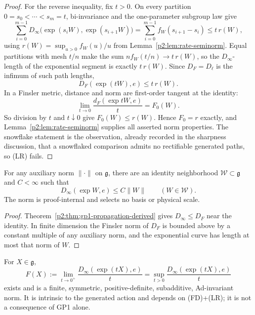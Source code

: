 \documentclass[11pt,a4paper]{article}
\begin{document}
\begin{proof}
For the reverse inequality, fix \(t>0\).  On every partition
\(0=s_0<\cdots<s_m=t\), bi-invariance and the one-parameter subgroup law
give
\[
 \sum_{i=0}^{m-1}
 D_\infty\bigl(\exp(s_iW),\exp(s_{i+1}W)\bigr)
 =
 \sum_{i=0}^{m-1}f_W(s_{i+1}-s_i)
 \le t\,r(W),
\]
using \(r(W)=\sup_{u>0}f_W(u)/u\) from
Lemma~\ref{p2:lem:rate-seminorm}.  Equal partitions with mesh \(t/n\)
make the sum \(n f_W(t/n)\to t\,r(W)\), so the
\(D_\infty\)-length of the exponential segment is exactly \(t\,r(W)\).
Since \(D_F=D_\ell\) is the infimum of such path lengths,
\[
 D_F(\exp(tW),e)\le t\,r(W).
\]
In a Finsler metric, distance and norm are first-order tangent at the
identity:
\[
 \lim_{t\to0}\frac{d_F(\exp tW,e)}{t}=F_0(W).
\]
So division by \(t\) and \(t\downarrow0\) give
\(F_0(W)\le r(W)\).  Hence \(F_0=r\) exactly, and
Lemma~\ref{p2:lem:rate-seminorm} supplies all asserted norm properties.
The snowflake statement is the observation,
already recorded in the sharpness discussion, that a snowflaked
comparison admits no rectifiable generated paths, so (LR) fails.
\end{proof}

\begin{lemma}
\label{p2:lem:second-kind-uniform-propagation}
For any auxiliary norm \(\lVert\cdot\rVert\) on \(\mathfrak g\), there are an
identity neighborhood \(\mathcal W\subset\mathfrak g\) and \(C<\infty\) such
that
\[
 D_\infty(\exp W,e)\le C\lVert W\rVert\qquad(W\in\mathcal W).
\]
The norm is proof-internal and selects no basis or physical scale.
\end{lemma}

\begin{proof}
Theorem~\ref{p2:thm:gp1-propagation-derived} gives
\(D_\infty\le D_F\) near the identity.  In finite dimension the Finsler norm
of \(D_F\) is bounded above by a constant multiple of any auxiliary norm, and
the exponential curve has length at most that norm of \(W\).
\end{proof}

\begin{corollary}
\label{p2:cor:gp1-first-order-norm-derived}
For \(X\in\mathfrak g\),
\[
 F(X):=\lim_{t\to0^+}\frac{D_\infty(\exp(tX),e)}{t}
      =\sup_{t>0}\frac{D_\infty(\exp(tX),e)}{t}
\]
exists and is a finite, symmetric, positive-definite, subadditive,
Ad-invariant norm.  It is intrinsic to the generated action and depends on
(FD)+(LR); it is not a consequence of GP1 alone.
\end{corollary}
\end{document}

